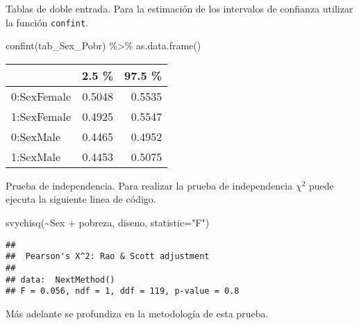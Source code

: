 \documentclass[
  ignorenonframetext,
]{beamer}
\newenvironment{Shaded}{\begin{snugshade}}{\end{snugshade}}
\newcommand{\AttributeTok}[1]{\textcolor[rgb]{0.77,0.63,0.00}{#1}}
\newcommand{\FunctionTok}[1]{\textcolor[rgb]{0.00,0.00,0.00}{#1}}
\newcommand{\NormalTok}[1]{#1}
\newcommand{\SpecialCharTok}[1]{\textcolor[rgb]{0.00,0.00,0.00}{#1}}
\newcommand{\StringTok}[1]{\textcolor[rgb]{0.31,0.60,0.02}{#1}}
\begin{document}
\begin{frame}[fragile]{Tablas de doble entrada.}
\protect\hypertarget{tablas-de-doble-entrada.-1}{}
Para la estimación de los intervalos de confianza utilizar la función
\texttt{confint}.

\begin{Shaded}
\begin{Highlighting}[]
\FunctionTok{confint}\NormalTok{(tab\_Sex\_Pobr) }\SpecialCharTok{\%\textgreater{}\%} \FunctionTok{as.data.frame}\NormalTok{()}
\end{Highlighting}
\end{Shaded}

\begin{longtable}[]{@{}lrr@{}}
\toprule
& 2.5 \% & 97.5 \% \\
\midrule
\endhead
0:SexFemale & 0.5048 & 0.5535 \\
1:SexFemale & 0.4925 & 0.5547 \\
0:SexMale & 0.4465 & 0.4952 \\
1:SexMale & 0.4453 & 0.5075 \\
\bottomrule
\end{longtable}
\end{frame}

\begin{frame}[fragile]{Prueba de independencia.}
\protect\hypertarget{prueba-de-independencia.}{}
Para realizar la prueba de independencia \(\chi^{2}\) puede ejecuta la
siguiente linea de código.

\begin{Shaded}
\begin{Highlighting}[]
\FunctionTok{svychisq}\NormalTok{(}\SpecialCharTok{\textasciitilde{}}\NormalTok{Sex }\SpecialCharTok{+}\NormalTok{ pobreza, diseno, }\AttributeTok{statistic=}\StringTok{"F"}\NormalTok{)}
\end{Highlighting}
\end{Shaded}

\begin{verbatim}
## 
##  Pearson's X^2: Rao & Scott adjustment
## 
## data:  NextMethod()
## F = 0.056, ndf = 1, ddf = 119, p-value = 0.8
\end{verbatim}

Más adelante se profundiza en la metodología de esta prueba.
\end{frame}
\end{document}
